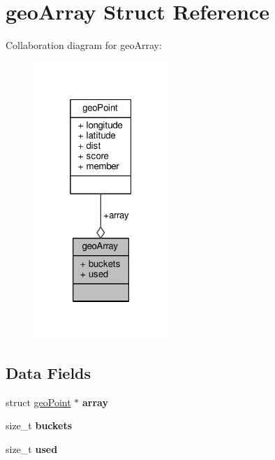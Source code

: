 \hypertarget{structgeoArray}{}\section{geo\+Array Struct Reference}
\label{structgeoArray}


Collaboration diagram for geo\+Array\+:\nopagebreak
\begin{figure}[H]
\begin{center}
\leavevmode
\includegraphics[width=145pt]{structgeoArray__coll__graph}
\end{center}
\end{figure}
\subsection*{Data Fields}
\begin{DoxyCompactItemize}
\item 
\mbox{\label{structgeoArray_a1cc43cbd466bbd97fd31f446b5820b0d}} 
struct \hyperlink{structgeoPoint}{geo\+Point} $\ast$ {\bfseries array}
\item 
\mbox{\label{structgeoArray_a2e70eb3d48466cd1e914c0e04c737425}} 
size\+\_\+t {\bfseries buckets}
\item 
\mbox{\label{structgeoArray_a4fc493a8a1ebc7855a1fee78376ad595}} 
size\+\_\+t {\bfseries used}
\end{DoxyCompactItemize}



